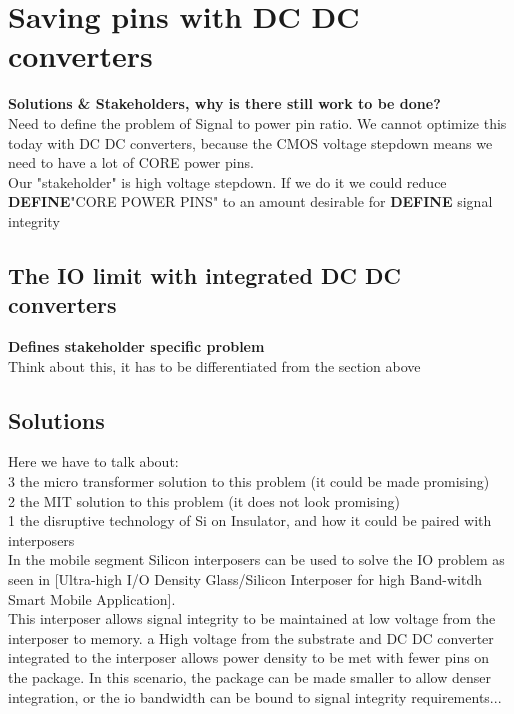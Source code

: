 \documentclass[letterpaper,twocolumn,10pt]{article}
\begin{document}
\section{Saving pins with DC DC converters}

\textbf{Solutions \& Stakeholders, why is there still work to be done?}\\
Need to define the problem of Signal to power pin ratio. We cannot optimize this today with DC DC converters, because the \@ CMOS voltage stepdown means we need to have a lot of CORE power pins.\\
Our "stakeholder" is high voltage stepdown. If we do it we could reduce \textbf{DEFINE}"CORE POWER PINS" to an amount desirable for \textbf{DEFINE} signal integrity\\

\subsection{The IO limit with integrated DC DC converters}

\textbf{Defines stakeholder specific problem}\\
Think about this, it has to be differentiated from the section above

\subsection{Solutions}

Here we have to talk about:\\
3 the micro transformer solution to this problem (it could be made promising) \\
2 the MIT solution to this problem (it does not look promising)\\
1 the disruptive technology of Si on Insulator, and how it could be paired with interposers\\
In the mobile segment Silicon interposers can be used to solve the IO problem as seen in [Ultra-high I/O Density Glass/Silicon Interposer for high Band-witdh Smart Mobile Application].\\
This interposer allows signal integrity to be maintained at low voltage from the interposer to memory. a High voltage from the substrate and DC DC converter integrated to the interposer allows power density to be met with fewer pins on the package. In this scenario, the package can be made smaller to allow denser integration, or the io bandwidth  can be bound to signal integrity requirements...\\
\end{document}
